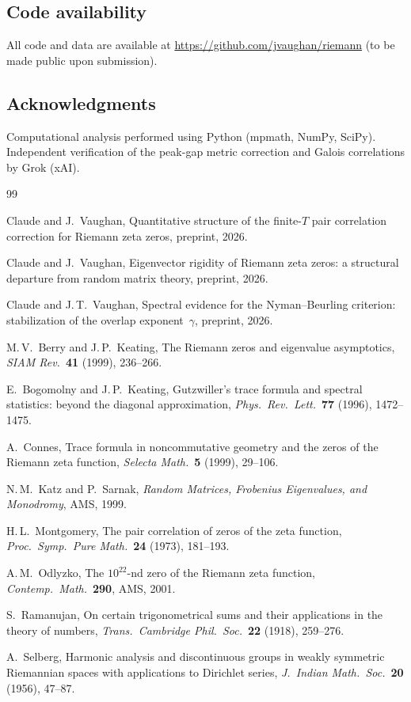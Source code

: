 \documentclass[11pt,a4paper]{article}
\begin{document}
\subsection*{Code availability}
All code and data are available at \url{https://github.com/jvaughan/riemann} (to be made public upon submission).

\subsection*{Acknowledgments}
Computational analysis performed using Python (mpmath, NumPy, SciPy).
Independent verification of the peak-gap metric correction and Galois correlations by Grok (xAI).

\begin{thebibliography}{99}

 Claude and J.~Vaughan, Quantitative structure of the finite-$T$ pair correlation correction for Riemann zeta zeros, preprint, 2026.

 Claude and J.~Vaughan, Eigenvector rigidity of Riemann zeta zeros: a structural departure from random matrix theory, preprint, 2026.

 Claude and J.\,T.~Vaughan, Spectral evidence for the Nyman--Beurling criterion: stabilization of the overlap exponent~$\gamma$, preprint, 2026.

 M.\,V.~Berry and J.\,P.~Keating, The Riemann zeros and eigenvalue asymptotics, \emph{SIAM Rev.}\ \textbf{41} (1999), 236--266.

 E.~Bogomolny and J.\,P.~Keating, Gutzwiller's trace formula and spectral statistics: beyond the diagonal approximation, \emph{Phys.\ Rev.\ Lett.}\ \textbf{77} (1996), 1472--1475.

 A.~Connes, Trace formula in noncommutative geometry and the zeros of the Riemann zeta function, \emph{Selecta Math.}\ \textbf{5} (1999), 29--106.

 N.\,M.~Katz and P.~Sarnak, \emph{Random Matrices, Frobenius Eigenvalues, and Monodromy}, AMS, 1999.

 H.\,L.~Montgomery, The pair correlation of zeros of the zeta function, \emph{Proc.\ Symp.\ Pure Math.}\ \textbf{24} (1973), 181--193.

 A.\,M.~Odlyzko, The $10^{22}$-nd zero of the Riemann zeta function, \emph{Contemp.\ Math.}\ \textbf{290}, AMS, 2001.

 S.~Ramanujan, On certain trigonometrical sums and their applications in the theory of numbers, \emph{Trans.\ Cambridge Phil.\ Soc.}\ \textbf{22} (1918), 259--276.

 A.~Selberg, Harmonic analysis and discontinuous groups in weakly symmetric Riemannian spaces with applications to Dirichlet series, \emph{J.\ Indian Math.\ Soc.}\ \textbf{20} (1956), 47--87.

\end{thebibliography}
\end{document}
